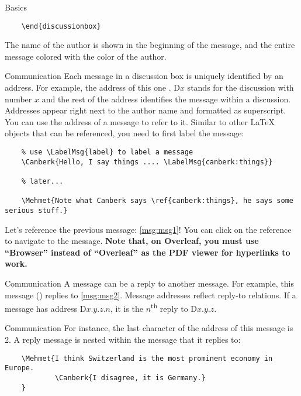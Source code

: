 \documentclass{article}
\begin{document}
\begin{discussionbox}
\begin{dboxmsg}{Basics}
\begin{verbatim}
    \end{discussionbox}
        \end{verbatim}
    
    \noindent The name of the author is shown in the beginning of the message, and the entire message colored with the color of the author.
    \end{dboxmsg}

    \begin{dboxmsg}{Communication}
        Each message in a discussion box is uniquely identified by an address.
        For example, the address of this one .
        D$x$ stands for the discussion with number $x$ and the rest of the address identifies the message within a discussion.
        Addresses appear right next to the author name and formatted as superscript.
        You can use the address of a message to refer to it.
        Similar to other \LaTeX{} objects that can be referenced, you need to first label the message:

        \begin{verbatim}
    % use \LabelMsg{label} to label a message
    \Canberk{Hello, I say things .... \LabelMsg{canberk:things}}

    % later...

    \Mehmet{Note what Canberk says \ref{canberk:things}, he says some serious stuff.}
        \end{verbatim}
        
        \noindent Let's reference the previous message: \ref{msg:msg1}!
        You can click on the reference to navigate to the message.
        \textbf{Note that, on Overleaf, you must use ``Browser'' instead of ``Overleaf'' as the PDF viewer for hyperlinks to work.}

        \begin{dboxmsg}{Communication}
            A message can be a reply to another message.
            For example, this message () replies to \ref{msg:msg2}.
            Message addresses reflect reply-to relations.
            If a message has address D$x$.$y$.$z$.$n$, it is the $n$\textsuperscript{th} reply to D$x$.$y$.$z$.
        \end{dboxmsg}
        \begin{dboxmsg}{Communication}
            For instance, the last character of the address of this message is 2.
            A reply message is nested within the message that it replies to:
            \begin{verbatim}
    \Mehmet{I think Switzerland is the most prominent economy in Europe.
            \Canberk{I disagree, it is Germany.}
    }


\end{verbatim}
\end{dboxmsg}
\end{dboxmsg}
\end{discussionbox}
\end{document}
